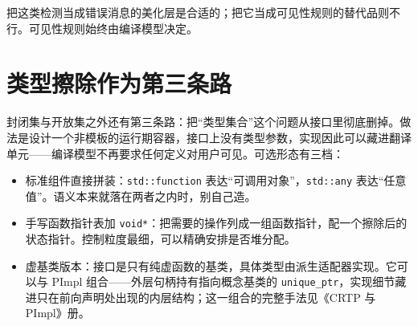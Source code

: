 \documentclass[12pt,a4paper,fontset=fandol]{ctexbook}
\newcommand{\kw}[1]{\texttt{#1}}
\begin{document}
把这类检测当成错误消息的美化层是合适的；把它当成可见性规则的替代品则不行。可见性规则始终由编译模型决定。

\section{类型擦除作为第三条路}

封闭集与开放集之外还有第三条路：把“类型集合”这个问题从接口里彻底删掉。做法是设计一个非模板的运行期容器，接口上没有类型参数，实现因此可以藏进翻译单元——编译模型不再要求任何定义对用户可见。可选形态有三档：

\begin{itemize}
\item 标准组件直接拼装：\kw{std::function} 表达“可调用对象”，\kw{std::any} 表达“任意值”。语义本来就落在两者之内时，别自己造。
\item 手写函数指针表加 \kw{void*}：把需要的操作列成一组函数指针，配一个擦除后的状态指针。控制粒度最细，可以精确安排是否堆分配。
\item 虚基类版本：接口是只有纯虚函数的基类，具体类型由派生适配器实现。它可以与 PImpl 组合——外层句柄持有指向概念基类的 \kw{unique\_ptr}，实现细节藏进只在前向声明处出现的内层结构；这一组合的完整手法见《CRTP 与 PImpl》册。
\end{itemize}
\end{document}
